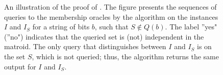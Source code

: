 \begin{figure}
\begin{center}
\begin{tikzpicture}[ultra thick,scale=1.1, every node/.style={scale=1}]
		
		\end{tikzpicture}
	\end{center}
	\caption{\label{fig:proof} An illustration of the proof of . The figure presents the sequences of queries to the membership oracles by the algorithm on the instances $I$ and $I_S$ for a string of bits $b$, such that $S \notin Q(b)$. The label ''yes" (''no") indicates that the queried set is (not) independent in the matroid. 
		The only query that distinguishes between $I$ and $I_S$ is on the set $S$, which is not queried; thus, the algorithm returns the same output for $I$ and $I_S$.}
\end{figure}


